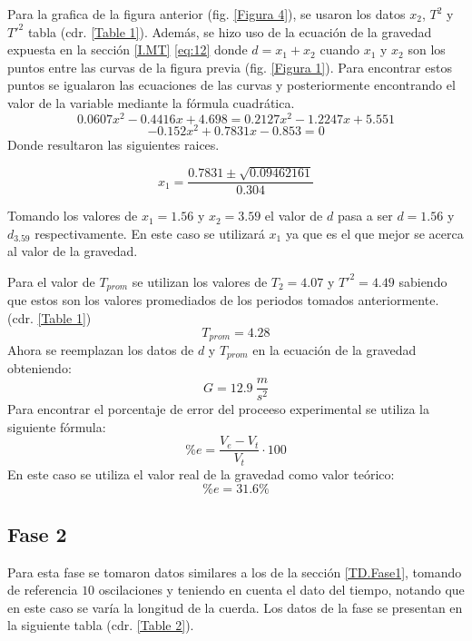 \documentclass[spanish,notitlepage,letterpaper, 12pt]{article}
\begin{document}
Para la grafica de la figura anterior (fig. \ref{Figura 4}), se usaron los datos $x_2$, $T^2$ y ${T\prime}^2$ tabla (cdr. \ref{Table 1}). Además, se hizo uso de la ecuación de la gravedad expuesta en la sección \ref{I.MT} \eqref{eq:12} donde $d=x_1+x_2$ cuando $x_1$ y $x_2$ son los puntos entre las curvas de la figura previa (fig. \ref{Figura 1}). Para encontrar estos puntos se igualaron las ecuaciones de las curvas y posteriormente encontrando el valor de la variable mediante la fórmula cuadrática.
\begin{equation}
    0.0607x^2-0.4416x+4.698=0.2127x^2-1.2247x+5.551
\end{equation}
\begin{equation}
    -0.152x^2+0.7831x-0.853=0
\end{equation}
Donde resultaron las siguientes raices.

\begin{equation}
    x_1=\frac{0.7831\pm\sqrt{0.09462161}}{0.304}
\end{equation}

Tomando los valores de $x_1=1.56$ y $x_2=3.59$ el valor de $d$ pasa a ser $d=1.56$ y $d_3.59$ respectivamente. En este caso se utilizará $x_1$ ya que es el que mejor se acerca al valor de la gravedad. \par
\bigskip
Para el valor de $T_{prom}$ se utilizan los valores de $T_2=4.07$ y $T\prime^2=4.49$ sabiendo que estos son los valores promediados de los periodos tomados anteriormente. (cdr. \ref{Table 1}) $$T_{prom}=4.28$$
Ahora se reemplazan los datos de $d$ y $T_{prom}$ en la ecuación de la gravedad obteniendo: $$G=12.9 \ \frac{m}{s^2}$$
Para encontrar el porcentaje de error del proceeso experimental se utiliza la siguiente fórmula: $$\%e=\frac{V_e-V_t}{V_t}\cdot100$$ En este caso se utiliza el valor real de la gravedad como valor teórico: $$\%e=31.6\%$$
\subsection{Fase 2}
Para esta fase se tomaron datos similares a los de la sección \ref{TD.Fase1}, tomando de referencia $10$ oscilaciones y teniendo en cuenta el dato del tiempo, notando que en este caso se varía la longitud de la cuerda. Los datos de la fase se presentan en la siguiente tabla (cdr. \ref{Table 2}).
\end{document}
